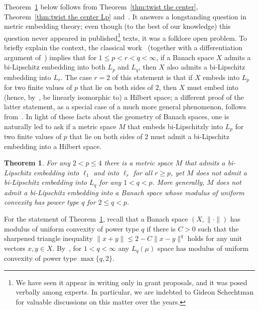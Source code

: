 \documentclass[11pt,reqno]{amsart}
\newcommand{\0}{\mathbf{0}}
\renewcommand{\1}{\mathbf 1}
\renewcommand{\ge}{\geqslant}
\renewcommand{\le}{\leqslant}
\newtheorem{thm}{Theorem}[section]
\theoremstyle{remark}
\begin{document}
Theorem~\ref{thm:two Lps} below follows from Theorem~\ref{thm:twist the center}, Theorem~\ref{thm:twist the center Lp} and~\cite{AusNaoTes,LafforgueNaor}. It  answers a  longstanding  question in metric embedding theory; even though (to the best of our knowledge) this question never appeared in published\footnote{We have seen it appear in writing  only in  grant proposals, and it was posed verbally among experts. In particular, we are indebted to Gideon Schechtman for valuable discussions on this matter over the years.} texts, it was a  folklore open problem. To briefly explain the context, the classical work~\cite{KP61} (together with a differentiation argument of~\cite{Man72}) implies that for  $1\le p< r< q<\infty$, if a Banach space $X$ admits a bi-Lipschitz embedding into both $L_p$ and $L_q$, then $X$ also admits a bi-Lipschitz embedding into $L_r$. The case $r=2$ of this statement is that if $X$ embeds into $L_p$ for two finite values of $p$ that lie on both sides of $2$, then $X$ must embed into (hence, by~\cite{Enf70},  be linearly isomorphic to) a Hilbert space; a different proof of the latter statement, as a special case of a much more general phenomenon, follows from~\cite{Kwa72}. In light of these facts about the geometry of Banach spaces, one is naturally led to ask if a metric space $M$ that embeds bi-Lipschitzly into $L_p$ for two finite values of $p$ that lie on both sides of $2$ must admit a bi-Lipschitz embedding into a Hilbert space.



\begin{thm}\label{thm:two Lps} For any $2<p\le 4$ there  is a metric space $M$  that admits a bi-Lipschitz embedding into $\ell_1$ and into $\ell_r$ for all $r\ge p$, yet $M$ does not admit a bi-Lipschitz embedding into $L_q$ for any $1<q<p$. More generally, $M$ does not admit a bi-Lipschitz embedding into a Banach space whose modulus of uniform convexity has power type $q$ for  $2\le q<p$.
\end{thm}
For the statement of Theorem~\ref{thm:two Lps}, recall that a Banach space $(X,\|\cdot\|)$ has modulus of uniform convexity of power type $q$ if there is $C>0$ such that the sharpened triangle inequality $\|x+y\|\le 2-C\|x-y\|^q$ holds for any unit vectors $x,y\in X$. By~\cite{Cla36,Han56},  for $1<q<\infty$ any $L_q(\mu)$ space has modulus of uniform convexity of power type $\max\{q,2\}$.
\end{document}
